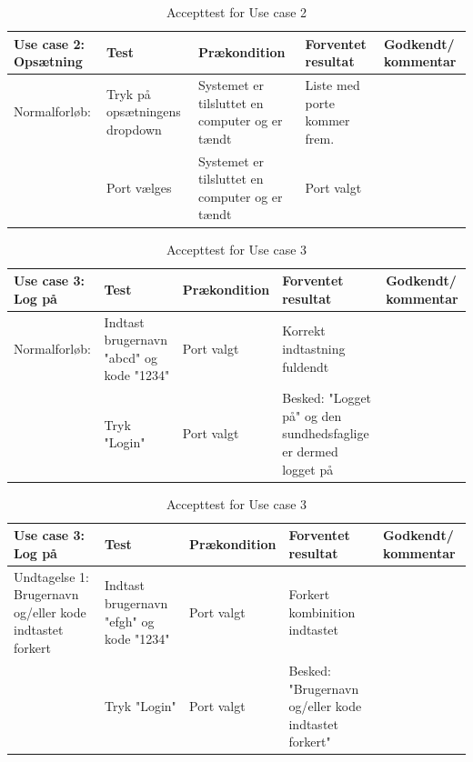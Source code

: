 \begin{table}[H]
\caption{Accepttest for Use case 2}\label{tab:tabel8}
\begin{tabular}{|>{\raggedright\arraybackslash}p{2.5cm}| >{\raggedright\arraybackslash}p{2.9cm} | >{\raggedright\arraybackslash}p{2.9cm} | >{\raggedright\arraybackslash}p{2.9cm} | >{\raggedright\arraybackslash}p{2.8cm} |}
   \hline
   \textbf{Use case 2: Opsætning} &\textbf{Test}& \textbf{Prækondition} & \textbf{Forventet resultat} & \textbf{Godkendt/ kommentar}\\ \hline
   Normalforløb:& Tryk på opsætningens dropdown  & Systemet er tilsluttet en computer og er tændt & Liste med porte kommer frem. & \\\hline
   &Port vælges & Systemet er tilsluttet en computer og er tændt & Port valgt &\\\hline
\end{tabular}
\end{table}

\begin{table}[H]
\caption{Accepttest for Use case 3}\label{tab:tabel8}
\begin{tabular}{|>{\raggedright\arraybackslash}p{2.5cm}| >{\raggedright\arraybackslash}p{2.9cm} | >{\raggedright\arraybackslash}p{2.9cm} | >{\raggedright\arraybackslash}p{2.9cm} | >{\raggedright\arraybackslash}p{2.8cm} |}
   \hline
   \textbf{Use case 3: Log på} &\textbf{Test}& \textbf{Prækondition} & \textbf{Forventet resultat} & \textbf{Godkendt/ kommentar}\\ \hline
   Normalforløb:& Indtast brugernavn "abcd" og kode "1234" & Port valgt & Korrekt indtastning fuldendt & \\\hline
   &Tryk "Login" & Port valgt & Besked: "Logget på" og den sundhedsfaglige er dermed logget på &\\\hline
\end{tabular}
\end{table}



\begin{table}[H]
\caption{Accepttest for Use case 3}\label{tab:tabel8}
\begin{tabular}{|>{\raggedright\arraybackslash}p{2.5cm}| >{\raggedright\arraybackslash}p{2.9cm} | >{\raggedright\arraybackslash}p{2.9cm} | >{\raggedright\arraybackslash}p{2.9cm} | >{\raggedright\arraybackslash}p{2.8cm} |}
   \hline
   \textbf{Use case 3: Log på} &\textbf{Test}& \textbf{Prækondition} & \textbf{Forventet resultat} & \textbf{Godkendt/ kommentar}\\ \hline
   Undtagelse 1: Brugernavn og/eller kode indtastet forkert & Indtast brugernavn "efgh" og kode "1234"& Port valgt & Forkert kombinition indtastet &  \\\hline
   &Tryk "Login" & Port valgt & Besked: "Brugernavn og/eller kode indtastet forkert" &\\\hline
\end{tabular}
\end{table}






